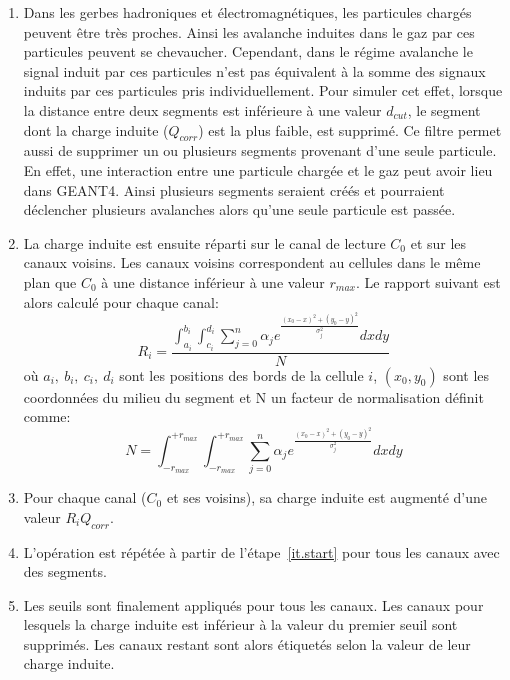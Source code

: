 \begin{enumerate}[~~1-]
\item Dans les gerbes hadroniques et électromagnétiques, les particules chargés peuvent être très proches. Ainsi les avalanche induites dans le gaz par ces particules peuvent se chevaucher. Cependant, dans le régime avalanche le signal induit par ces particules n'est pas équivalent à la somme des signaux induits par ces particules pris individuellement. Pour simuler cet effet, lorsque la distance entre deux segments est inférieure à une valeur $d_{cut}$, le segment dont la charge induite ($Q_{corr}$) est la plus faible, est supprimé. Ce filtre permet aussi de supprimer un ou plusieurs segments provenant d'une seule particule. En effet, une interaction entre une particule chargée et le gaz peut avoir lieu dans GEANT4. Ainsi plusieurs segments seraient créés et pourraient déclencher plusieurs avalanches alors qu'une seule particule est passée.
\item \label{it.spliting} La charge induite est ensuite réparti sur le canal de lecture $C_0$  et sur les canaux voisins. Les canaux voisins correspondent au cellules dans le même plan que $C_0$ à une distance inférieur à une valeur $r_{max}$. Le rapport suivant est alors calculé pour chaque canal:
  \begin{equation}
    \label{eq.ratio}
    R_i = \frac{\int_{a_i}^{b_i}\int_{c_i}^{d_i}\sum_{j=0}^{n}\alpha_j e^{ \frac{(x_0-x)^2+(y_0-y)^2}{\sigma_j^2}}dxdy}{N}
  \end{equation}
  où $a_i,\ b_i,\ c_i,\ d_i$ sont les positions des bords de la cellule $i$, $(x_0,y_0)$ sont les coordonnées du milieu du segment et N un facteur de normalisation définit comme: 
  \begin{equation}
    \label{eq.norm}
    N=\int_{-r_{max}}^{+r_{max}}\int_{-r_{max}}^{+r_{max}}\sum_{j=0}^{n}\alpha_j e^{ \frac{(x_0-x)^2+(y_0-y)^2}{\sigma_j^2}}dxdy
  \end{equation}
\item Pour chaque canal ($C_0$ et ses voisins), sa charge induite est augmenté d'une valeur $R_iQ_{corr}$.
\item L'opération est répétée à partir de l'étape~\ref{it.start} pour tous les canaux avec des segments.
\item Les seuils sont finalement appliqués pour tous les canaux. Les canaux pour lesquels la charge induite est inférieur à la valeur du premier seuil sont supprimés. Les canaux restant sont alors étiquetés selon la valeur de leur charge induite. 
\end{enumerate}

